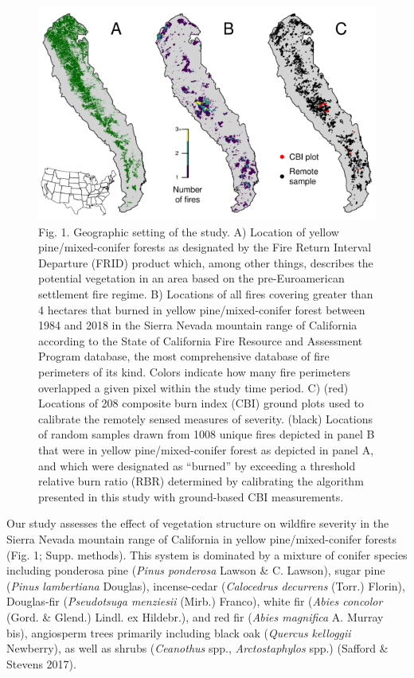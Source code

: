 \documentclass[]{article}
\begin{document}
\begin{figure}
\centering
\includegraphics{../../figures/study-geographic-setting.pdf}
\caption{Fig. 1. Geographic setting of the study. A) Location of yellow
pine/mixed-conifer forests as designated by the Fire Return Interval
Departure (FRID) product which, among other things, describes the
potential vegetation in an area based on the pre-Euroamerican settlement
fire regime. B) Locations of all fires covering greater than 4 hectares
that burned in yellow pine/mixed-conifer forest between 1984 and 2018 in
the Sierra Nevada mountain range of California according to the State of
California Fire Resource and Assessment Program database, the most
comprehensive database of fire perimeters of its kind. Colors indicate
how many fire perimeters overlapped a given pixel within the study time
period. C) (red) Locations of 208 composite burn index (CBI) ground
plots used to calibrate the remotely sensed measures of severity.
(black) Locations of random samples drawn from 1008 unique fires
depicted in panel B that were in yellow pine/mixed-conifer forest as
depicted in panel A, and which were designated as ``burned'' by
exceeding a threshold relative burn ratio (RBR) determined by
calibrating the algorithm presented in this study with ground-based CBI
measurements.}
\end{figure}

Our study assesses the effect of vegetation structure on wildfire
severity in the Sierra Nevada mountain range of California in yellow
pine/mixed-conifer forests (Fig. 1; Supp. methods). This system is
dominated by a mixture of conifer species including ponderosa pine
(\emph{Pinus ponderosa} Lawson \& C. Lawson), sugar pine (\emph{Pinus
lambertiana} Douglas), incense-cedar (\emph{Calocedrus decurrens}
(Torr.) Florin), Douglas-fir (\emph{Pseudotsuga menziesii} (Mirb.)
Franco), white fir (\emph{Abies concolor} (Gord. \& Glend.) Lindl. ex
Hildebr.), and red fir (\emph{Abies magnifica} A. Murray bis),
angiosperm trees primarily including black oak (\emph{Quercus kelloggii}
Newberry), as well as shrubs (\emph{Ceanothus} spp.,
\emph{Arctostaphylos} spp.) (Safford \& Stevens 2017).
\end{document}
